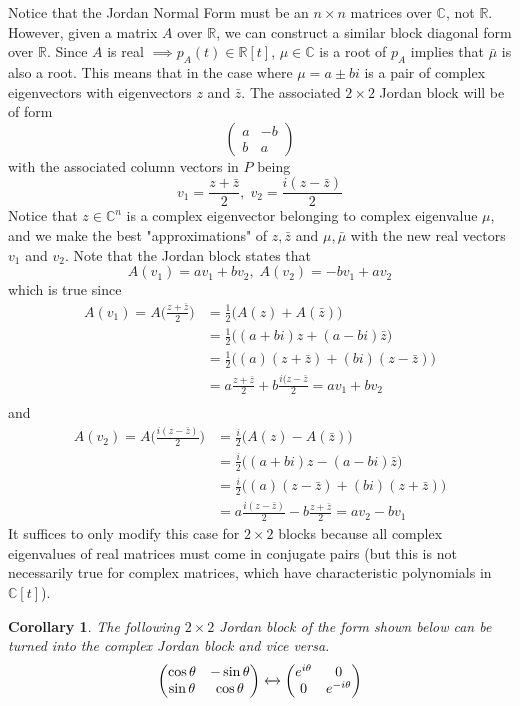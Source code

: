 \documentclass{article}
\newtheorem{corollary}{Corollary}[theorem]
\theoremstyle{remark}
\theoremstyle{definition}
\begin{document}
Notice that the Jordan Normal Form must be an $n \times n$ matrices over $\mathbb{C}$, not $\mathbb{R}$. However, given a matrix $A$ over $\mathbb{R}$, we can construct a similar block diagonal form over $\mathbb{R}$. Since $A$ is real $\implies p_A (t) \in \mathbb{R}[t]$, $\mu \in \mathbb{C}$ is a root of $p_A$ implies that $\bar{\mu}$ is also a root. This means that in the case where $\mu = a \pm b i$ is a pair of complex eigenvectors with eigenvectors $z$ and $\bar{z}$. The associated $2 \times 2$ Jordan block will be of form
\[\begin{pmatrix}
a&-b\\ b&a
\end{pmatrix}\]
with the associated column vectors in $P$ being
\[v_1 = \frac{z + \bar{z}}{2}, \; v_2 = \frac{i (z - \bar{z})}{2}\]
Notice that $z \in \mathbb{C}^n$ is a complex eigenvector belonging to complex eigenvalue $\mu$, and we make the best "approximations" of $z, \bar{z}$ and $\mu, \bar{\mu}$ with the new real vectors $v_1$ and $v_2$. Note that the Jordan block states that
\[A(v_1) = a v_1 + b v_2, \; A(v_2) = -b v_1 + a v_2\]
which is true since 
\begin{align*}
    A(v_1) = A\Big( \frac{z + \bar{z}}{2} \Big) & = \frac{1}{2} \big( A(z) + A(\bar{z}) \big) \\
    & = \frac{1}{2}\big( (a+bi)z + (a-bi) \bar{z} \big) \\
    & = \frac{1}{2} \big( (a)(z + \bar{z}) + (bi) (z - \bar{z})\big) \\
    & = a \frac{z + \bar{z}}{2} + b \frac{i(z-\bar{z}}{2} = a v_1 + b v_2 \\
\end{align*}
and 
\begin{align*}
    A(v_2) = A \Big( \frac{i(z-\bar{z})}{2} \Big) & = \frac{i}{2} \big( A(z) - A(\bar{z}) \big) \\
    & = \frac{i}{2} \big( (a+bi) z - (a-bi) \bar{z}\big) \\
    & = \frac{i}{2} \big( (a) (z - \bar{z}) + (bi)(z+\bar{z})\big) \\
    & = a \frac{i(z-\bar{z})}{2} - b \frac{z + \bar{z}}{2} = a v_2 - b v_1
\end{align*}
It suffices to only modify this case for $2 \times 2$ blocks because all complex eigenvalues of real matrices must come in conjugate pairs (but this is not necessarily true for complex matrices, which have characteristic polynomials in $\mathbb{C}[t]$). 

\begin{corollary}
The following $2 \times 2$ Jordan block of the form shown below can be turned into the complex Jordan block and vice versa. 
\[\begin{pmatrix}
\cos{\theta} & -\sin{\theta} \\
\sin{\theta} & \cos{\theta} 
\end{pmatrix} \xleftrightarrow{} \begin{pmatrix}
e^{i \theta} & 0 \\
0 & e^{- i \theta}
\end{pmatrix}\]
\end{corollary}
\end{document}
